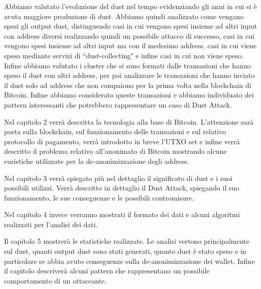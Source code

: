 Abbiamo valutato l'evoluzione del dust nel tempo evidenziando gli anni in cui si è avuta maggiore produzione di dust. Abbiamo quindi analizzato come vengano spesi gli output dust, distinguendo casi in cui vengono spesi insieme ad altri input con address diversi realizzando quindi un possibile attacco di successo, casi in cui vengono spesi insieme ad altri input ma con il medesimo address, casi in cui viene speso mediante servizi di ``dust-collecting" e infine casi in cui non viene speso. Infine abbiamo valutato i cluster che si sono formati dalle transazioni che hanno speso il dust con altri address, per poi analizzare le transazioni che hanno inviato il dust solo ad address che non compaiono per la prima volta nella blockchain di Bitcoin. Infine abbiamo considerato queste transazioni e abbiamo individuato dei pattern interessanti che potrebbero rappresentare un caso di Dust Attack.
 
Nel capitolo 2 verrà descritta la tecnologia alla base di Bitcoin. L'attenzione sarà posta sulla blockchain, sul funzionamento delle transazioni e sul relativo protocollo di pagamento, verrà introdotto in breve l'UTXO set e infine verrà descritto il problema relativo all'anonimato di Bitcoin mostrando alcune euristiche utilizzate per la de-anonimizzazione degli address.

Nel capitolo 3 verrà spiegato più nel dettaglio il significato di dust e i suoi possibili utilizzi. Verrà descritto in dettaglio il Dust Attack, spiegando il suo funzionamento, le sue conseguenze e le possibili contromisure.

Nel capitolo 4 invece verranno mostrati il formato dei dati e alcuni algoritmi realizzati per l'analisi dei dati.

Il capitolo 5 mostrerà le statistiche realizzate. Le analisi vertono principalmente sul dust, quanti output dust sono stati generati, quanto dust è stato speso e in particolare se abbia avuto conseguenze sulla de-anonimizzazione dei wallet. Infine il capitolo descriverà alcuni pattern che rappresentano un possibile comportamento di un attaccante.